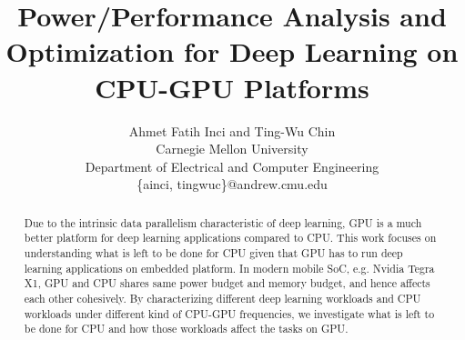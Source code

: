 \documentclass[times, 10pt,twocolumn]{article}
\begin{document}
\title{Power/Performance Analysis and Optimization for Deep Learning on CPU-GPU Platforms}

\author{Ahmet Fatih Inci and Ting-Wu Chin  \\
Carnegie Mellon University\\ Department of Electrical and Computer Engineering \\ \{ainci, tingwuc\}@andrew.cmu.edu\\
}
\maketitle
\thispagestyle{empty}

\begin{abstract}
    Due to the intrinsic data parallelism characteristic of deep learning, GPU is a much better platform for deep learning applications compared to CPU. This work focuses on understanding what is left to be done for CPU given that GPU has to run deep learning applications on embedded platform. In modern mobile SoC, e.g. Nvidia Tegra X1, GPU and CPU shares same power budget and memory budget, and hence affects each other cohesively. By characterizing different deep learning workloads and CPU workloads under different kind of CPU-GPU frequencies, we investigate what is left to be done for CPU and how those workloads affect the tasks on GPU. 

\end{abstract}






%



\end{document}
